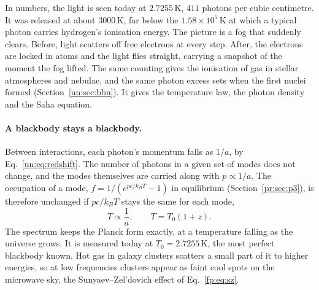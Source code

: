 In numbers, the light is seen today at $2.7255\,\mathrm{K}$, $411$ photons per cubic centimetre. It was released at about $3000\,\mathrm K$, far below the $1.58\times10^5\,\mathrm K$ at which a typical photon carries hydrogen's ionisation energy. The picture is a fog that suddenly clears. Before, light scatters off free electrons at every step. After, the electrons are locked in atoms and the light flies straight, carrying a snapshot of the moment the fog lifted. The same counting gives the ionisation of gas in stellar atmospheres and nebulae, and the same photon excess sets when the first nuclei formed (Section~\ref{un:sec:bbn}). It gives the temperature law, the photon density and the Saha equation.

\paragraph{A blackbody stays a blackbody.} Between interactions, each photon's momentum falls as $1/a$, by Eq.~\eqref{un:eq:redshift}. The number of photons in a given set of modes does not change, and the modes themselves are carried along with $p\propto1/a$. The occupation of a mode, $f=1/(e^{pc/k_BT}-1)$ in equilibrium (Section~\ref{pr:sec:p3}), is therefore unchanged if $pc/k_BT$ stays the same for each mode,
\begin{equation}
	\boxed{T\propto\frac1a,\qquad T=T_0(1+z).}
	\label{un:eq:T_scaling}
\end{equation}
The spectrum keeps the Planck form exactly, at a temperature falling as the universe grows. It is measured today at $T_0=2.7255\,\mathrm K$, the most perfect blackbody known. Hot gas in galaxy clusters scatters a small part of it to higher energies, so at low frequencies clusters appear as faint cool spots on the microwave sky, the Sunyaev–Zel'dovich effect of Eq.~\eqref{fp:eq:sz}.

